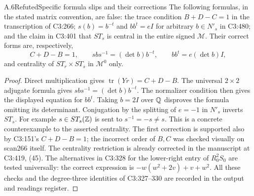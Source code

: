 \begin{statement}{A.6}{Refuted}{Specific formula slips and their corrections}
The following formulas, in the stated matrix convention, are false:
the trace condition $B+D-C=1$ in the transcription of C3:266;
$s(b)=b^{-t}$ and $bb^t=eI$ for arbitrary $b\in N'_s$ in C3:480;
and the claim in C3:401 that $ST_s$ is central in the entire signed
$\mathcal M$. Their correct forms are, respectively,
\[
 C+D-B=1,\qquad sbs^{-1}=(\det b)b^{-t},\qquad
 bb^t=e(\det b)I,
\]
and centrality of $ST_r\times ST_s$ in $\mathcal M^0$ only.
\end{statement}
\begin{proof}
Direct multiplication gives $\operatorname{tr}(Yr)=C+D-B$.
The universal $2\times2$ adjugate formula gives
$sbs^{-1}=(\det b)b^{-t}$. The normalizer condition then gives the
displayed equation for $bb^t$. Taking $b=2I$ over $\mathbb Q$ disproves
the formula omitting its determinant. Conjugation by the splitting
of $e=-1$ in $N'_s$ inverts $ST_s$. For example $s\in ST_s(\mathbb Z)$
is sent to $s^{-1}=-s\ne s$. This is a concrete counterexample to
the asserted centrality. The first correction is supported also by
C3:151's $C+D-B=1$; the incorrect order of $B,C$ was checked
visually on scan266 itself. The centrality restriction is already
corrected in the manuscript at C3:419, (45). The alternatives in C3:328 for the lower-right entry
of $R_0^2S_0$ are tested universally: the correct expression is
$-w(w^2+2v)+v+w^2$. All these checks and the degree-three identities
of C3:327--330 are recorded in the output and readings register.
\end{proof}


